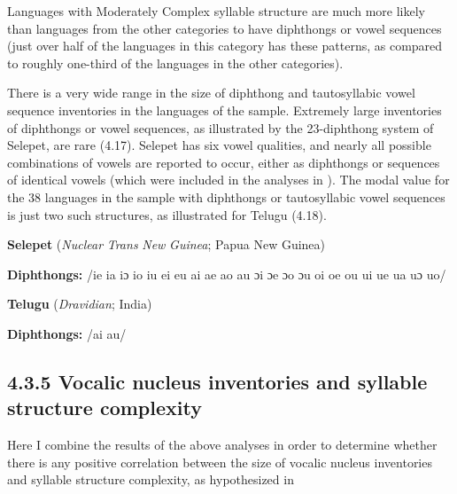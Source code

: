   Languages with Moderately Complex syllable structure are much more likely than languages from the other categories to have diphthongs or vowel sequences (just over half of the languages in this category has these patterns, as compared to roughly one-third of the languages in the other categories).



  There is a very wide range in the size of diphthong and tautosyllabic vowel sequence inventories in the languages of the sample. Extremely large inventories of diphthongs or vowel sequences, as illustrated by the 23-diphthong system of Selepet, are rare (4.17). Selepet has six vowel qualities, and nearly all possible combinations of vowels are reported to occur, either as diphthongs or sequences of identical vowels (which were included in the analyses in ). The modal value for the 38 languages in the sample with diphthongs or tautosyllabic vowel sequences is just two such structures, as illustrated for Telugu (4.18).



\ea\label{ex:(4.17)}
   \textbf{Selepet} (\textit{Nuclear} \textit{Trans} \textit{New} \textit{Guinea}; Papua New Guinea)



\textbf{Diphthongs:} /ie ia iɔ io iu ei eu ai ae ao au ɔi ɔe ɔo ɔu oi oe ou ui ue ua uɔ uo/
\z



\ea\label{ex:(4.18)}
  \textbf{Telugu} (\textit{Dravidian}; India)



\textbf{Diphthongs:} /ai au/
\z


\subsection{4.3.5 Vocalic nucleus inventories and syllable structure complexity}

  Here I combine the results of the above analyses in order to determine whether there is any positive correlation between the size of vocalic nucleus inventories and syllable structure complexity, as hypothesized in 




